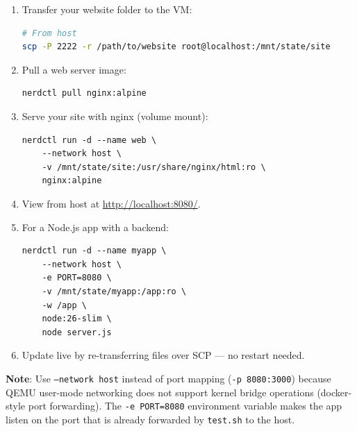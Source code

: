 \begin{enumerate}[nosep]
  \item Transfer your website folder to the VM:
\begin{lstlisting}[language=bash]
# From host
scp -P 2222 -r /path/to/website root@localhost:/mnt/state/site
\end{lstlisting}
  \item Pull a web server image:
\begin{lstlisting}
nerdctl pull nginx:alpine
\end{lstlisting}
  \item Serve your site with nginx (volume mount):
\begin{lstlisting}
nerdctl run -d --name web \
    --network host \
    -v /mnt/state/site:/usr/share/nginx/html:ro \
    nginx:alpine
\end{lstlisting}
  \item View from host at \url{http://localhost:8080/}.
  \item For a Node.js app with a backend:
\begin{lstlisting}
nerdctl run -d --name myapp \
    --network host \
    -e PORT=8080 \
    -v /mnt/state/myapp:/app:ro \
    -w /app \
    node:26-slim \
    node server.js
\end{lstlisting}
  \item Update live by re-transferring files over SCP --- no restart needed.
\end{enumerate}

\textbf{Note}: Use \texttt{--network host} instead of port mapping (\texttt{-p 8080:3000})
because QEMU user-mode networking does not support kernel bridge operations
(docker-style port forwarding). The \texttt{-e PORT=8080} environment variable
makes the app listen on the port that is already forwarded by \texttt{test.sh}
to the host.
